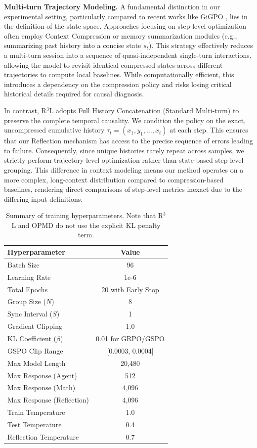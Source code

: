 \textbf{Multi-turn Trajectory Modeling.} A fundamental distinction in our experimental setting, particularly compared to recent works like GiGPO \cite{feng2025group}, lies in the definition of the state space. Approaches focusing on step-level optimization often employ Context Compression or memory summarization modules (e.g., summarizing past history into a concise state $s_t$). This strategy effectively reduces a multi-turn session into a sequence of quasi-independent single-turn interactions, allowing the model to revisit identical compressed states across different trajectories to compute local baselines. While computationally efficient, this introduces a dependency on the compression policy and risks losing critical historical details required for causal diagnosis.

In contrast, R$^3$L adopts Full History Concatenation (Standard Multi-turn) to preserve the complete temporal causality. We condition the policy on the exact, uncompressed cumulative history $\tau_t = (x_1, y_1, \dots, x_t)$ at each step. This ensures that our Reflection mechanism has access to the precise sequence of errors leading to failure. Consequently, since unique histories rarely repeat across samples, we strictly perform trajectory-level optimization rather than state-based step-level grouping. This difference in context modeling means our method operates on a more complex, long-context distribution compared to compression-based baselines, rendering direct comparisons of step-level metrics inexact due to the differing input definitions.

\begin{table}[h]
\centering
\small
\begin{tabular}{lc}
\toprule
\textbf{Hyperparameter} & \textbf{Value} \\
\midrule
Batch Size & 96 \\
Learning Rate & $1\text{e-}6$ \\
Total Epochs & 20 with Early Stop \\
Group Size ($N$) & 8 \\
Sync Interval ($S$) & 1 \\
Gradient Clipping & 1.0 \\
KL Coefficient ($\beta$) & 0.01 for GRPO/GSPO \\
GSPO Clip Range & [0.0003, 0.0004] \\
Max Model Length & 20,480 \\
Max Response (Agent) & 512 \\
Max Response (Math) & 4,096 \\
Max Response (Reflection) & 4,096 \\
Train Temperature & 1.0 \\
Test Temperature & 0.4 \\
Reflection Temperature & 0.7 \\
\bottomrule
\end{tabular}
\caption{Summary of training hyperparameters. Note that R$^3$L and OPMD do not use the explicit KL penalty term.}
\label{tab:hyperparams}
\end{table}

